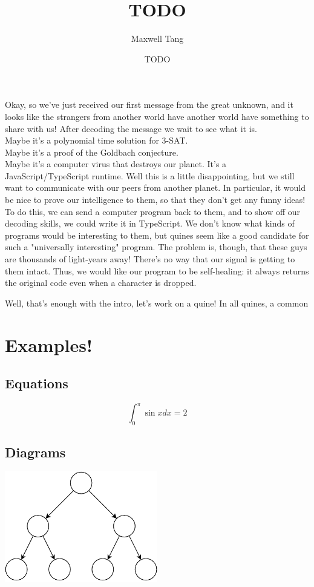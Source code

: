 \documentclass{article}
\title{TODO}
\author{Maxwell Tang}
\date{TODO}
\begin{document}
\maketitle
Okay, so we've just received our first message from the great unknown,
    and it looks like the strangers from another world have another world have something to share with us!
After decoding the message we wait to see what it is. \vspace*{0.25cm}
\\Maybe it's a polynomial time solution for 3-SAT.
\\Maybe it's a proof of the Goldbach conjecture.
\\Maybe it's a computer virus that destroys our planet.
\bigbreak
It's a JavaScript/TypeScript runtime.
\bigbreak
Well this is a little disappointing, but we still want to communicate with our peers from another planet.
In particular, it would be nice to prove our intelligence to them, so that they don't get any funny ideas!
To do this, we can send a computer program back to them, and to show off our decoding skills, we could write it in TypeScript.
We don't know what kinds of programs would be interesting to them, but quines seem like a good candidate for such a "universally interesting" program.
The problem is, though, that these guys are thousands of light-years away!
There's no way that our signal is getting to them intact.
Thus, we would like our program to be self-healing: it always returns the original code even when a character is dropped.

Well, that's enough with the intro, let's work on a quine!
In all quines, a common 








\section*{Examples!}

\subsection*{Equations}
$$\int_{0}^{\pi}\sin x dx = 2$$

\subsection*{Diagrams}
\begin{center}
    \includegraphics[width=0.5\textwidth]{example-figure.pdf}
\end{center}
\end{document}
